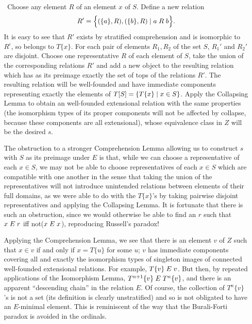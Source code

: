 \preuve\ Choose any element $R$ of an
element $x$ of $S$.  Define a new relation
$$
 R' =
 \Bigl\{(\{a\},R),(\{b\},R)\mid a \mathrel{R} b\Bigr\}.
$$
It is easy to see that
$R'$ exists by stratified comprehension and is isomorphic to $R^{\iota}$, so belongs to
$T\{x\}$.  For each pair of elements $R_1,R_2$ of the set $S$,
$R_1'$ and $R_2'$ are disjoint.  Choose one
representative $R$ of each element of $S$, take the
union of the corresponding relations $R'$ and add a
new object to the resulting relation which has as its preimage
exactly the set of tops of the relations $R'$.  The resulting
relation will be well-founded and have immediate components
representing exactly the elements of $T[S] = \{T\{x\} \mid x \in
S\}$.  Apply the Collapsing Lemma to obtain an well-founded
extensional relation with the same properties (the isomorphism types
of its proper components will not be affected by collapse, because
these components are all extensional), whose equivalence
class in $Z$ will
be the desired $s$.
\finpreuve

The obstruction to a stronger Comprehension Lemma allowing
us to construct $s$ with $S$ as its preimage under $E$ is that, while we can
choose a representative of each $x \in S$, we may not be able to
choose representatives of each $x \in S$ which are compatible with one
another in the sense that taking the union of the
representatives will 
not introduce unintended relations between elements of their full
domains, as we were able to do with the $T\{x\}$'s by taking
pairwise disjoint representatives and applying the Collapsing
Lemma.  It is fortunate that there is such an obstruction, since we would
otherwise be able to find an $r$ such that $x \mathrel{E} r$ iff not($x \mathrel{E} x$),
reproducing Russell's paradox!

Applying the Comprehension Lemma, we see that there is an
element $v$ of $Z$ such that $x\in v$ if and only if $x = T\{u\}$ for some $u$;
$v$ has immediate components covering all and exactly the
isomorphism
types of singleton images of connected well-founded
extensional relations.  For
example, $T\{v\}\mathrel{E} v$.  But then, by repeated 
applications of the Isomorphism Lemma, $T^{n+1}\{v\}\mathrel{E} T^n\{v\}$,
and there is an apparent ``descending chain'' in the relation $E$.  Of
course, the collection of $T^n\{v\}$'s is not a set (its definition is
clearly unstratified) and so is not obligated to have an
$E$-minimal element.  This is reminiscent of the way that the Burali-Forti
paradox 
is avoided in the ordinals.





